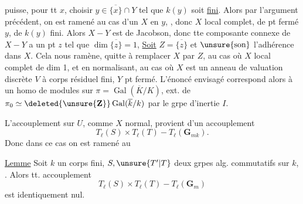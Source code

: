 puisse, pour tt $x$, choisir $y\in\overline{\{x\}}\cap Y$ tel que $k(y)$ soit \uline{fini}.  Alors par l'argument précédent, on est ramené au cas d'un   $X$ en $y$, , donc $X$ local complet, de pt fermé $y$, de $k(y)$ fini. Alors $X-Y$ est de Jacobson, donc tte composante connexe de $X-Y$ a un pt $z$ tel que $\dim\overline{\{z\}}=1$, \uline{Soit} $Z=\overline{\{z\}}$ et $\unsure{\text{son}}$ l'adhérence dans $X$. Cela nous ramène,  quitte à remplacer $X$ par $Z$, au cas où $X$ local complet de dim 1, et en normalisant, au cas où $X$ est  un anneau de valuation discrète $V$ à corps résiduel fini, $Y$ pt fermé. L'énoncé envisagé correspond alors à un homo de modules sur $\pi=\operatorname{Gal}(\overline K/K)$, ext. de $\pi_0\simeq\deleted{\unsure{\mathbf Z}}\operatorname{Gal}(\overline k/k)$  par le grpe d'inertie $I$.

L'accouplement sur $U$, comme $X$ normal, provient d'un accouplement
\[
T_\ell(S)\times T_\ell(T)\mathbin{-}T_\ell(\mathbf G_{mk}).
\]
Donc dans ce cas on est ramené au

\uline{Lemme} Soit $k$ un corps fini, $S,\unsure{T'|T}$ deux grpes alg. commutatifs sur $k$,  . Alors tt. accouplement
\[
T_\ell(S)\times T_\ell(T)\mathbin{-}T_\ell(\mathbf G_m)
\]
est identiquement nul.
